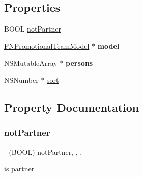 \subsection*{Properties}
\begin{DoxyCompactItemize}
\item 
B\+O\+OL \mbox{\hyperlink{interface_f_n_promotional_team_view_model_ab6f11c48f62cf079ae0e4179bf401802}{not\+Partner}}
\item 
\mbox{\label{interface_f_n_promotional_team_view_model_a8e1cf1348d887a3842293165ec1b95f6}} 
\mbox{\hyperlink{interface_f_n_promotional_team_model}{F\+N\+Promotional\+Team\+Model}} $\ast$ {\bfseries model}
\item 
\mbox{\label{interface_f_n_promotional_team_view_model_a9e0c90b0dee77372fa41510bd40b64fb}} 
N\+S\+Mutable\+Array $\ast$ {\bfseries persons}
\item 
N\+S\+Number $\ast$ \mbox{\hyperlink{interface_f_n_promotional_team_view_model_a4e8ce72652fb24d9c5b3562817433487}{sort}}
\end{DoxyCompactItemize}


\subsection{Property Documentation}
\mbox{\label{interface_f_n_promotional_team_view_model_ab6f11c48f62cf079ae0e4179bf401802}} 
\subsubsection{\texorpdfstring{not\+Partner}{notPartner}}
{\footnotesize\ttfamily -\/ (B\+O\+OL) not\+Partner\hspace{0.3cm}{\ttfamily [read]}, {\ttfamily [write]}, {\ttfamily [nonatomic]}, {\ttfamily [assign]}}

is partner \mbox{\label{interface_f_n_promotional_team_view_model_a4e8ce72652fb24d9c5b3562817433487}} 
